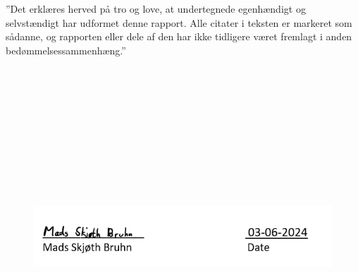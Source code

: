 \noindent”Det erklæres herved på tro og love, at undertegnede egenhændigt og selvstændigt har 
udformet denne rapport. Alle citater i teksten er markeret som sådanne, og rapporten eller dele af den har ikke tidligere været fremlagt i anden bedømmelsessammenhæng.”
\\
\\
\\
\\
\\
\\
\\
\\
\\
\\
\\
\begin{figure}[H]
    \centering
    \includegraphics[width=\textwidth]{Figures/signature.png}
\end{figure}